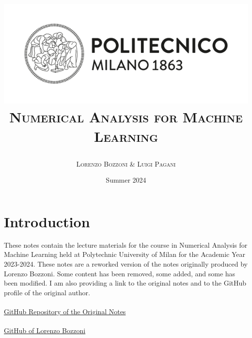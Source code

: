 \documentclass{article}
\title{
    \includegraphics[scale=0.6]{../images/LogoPoli2.jpg}\\[2cm]
    \huge{\textsc{Numerical Analysis for Machine Learning}}
    \author{\Large{\textsc{ Lorenzo Bozzoni \& Luigi Pagani }}\\
    }
  \date{Summer 2024}}
\begin{document}

\maketitle

\section*{Introduction}

These notes contain the lecture materials for the course in Numerical Analysis for Machine Learning held at Polytechnic University of Milan for the Academic Year 2023-2024. These notes are a reworked version of the notes originally produced by Lorenzo Bozzoni. Some content has been removed, some added, and some has been modified. I am also providing a link to the original notes and to the GitHub profile of the original author.\\ \\
\href{https://github.com/LorenzoBozzoni/NAML_notes}{GitHub Repository of the Original Notes}\\ \\
\href{https://github.com/LorenzoBozzoni}{GitHub of Lorenzo Bozzoni}
\newpage
\tableofcontents












% 
% 




\end{document}

